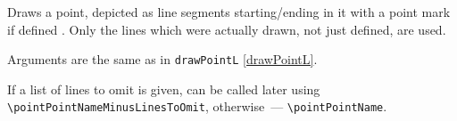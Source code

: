	Draws a point, depicted as line segments starting/ending in it with a point mark if defined . Only the lines which were actually drawn, not just defined, are used.

	Arguments are the same as in \texttt{drawPointL} \ref{drawPointL}.
	
	If a list of lines to omit is given, can be called later using \texttt{\textbackslash point\-Point\-Name\-Minus\-Lines\-To\-Omit}, otherwise~— \texttt{\textbackslash pointPointName}. 





